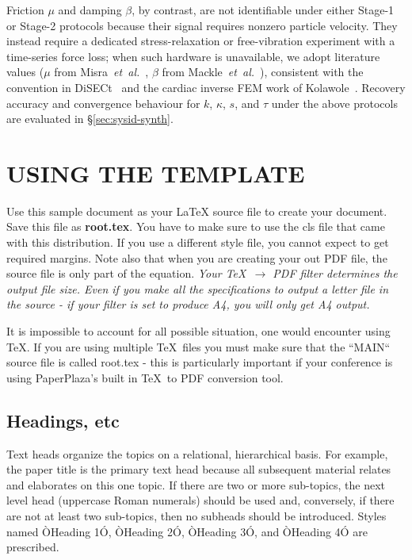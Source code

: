 \documentclass[letterpaper, 10 pt, conference]{ieeeconf}  %
\theoremstyle{tight}
\begin{document}
Friction $\mu$ and damping $\beta$, by contrast, are not identifiable
under either Stage-1 or Stage-2 protocols because their signal
requires nonzero particle velocity. They instead require a dedicated
stress-relaxation or free-vibration experiment with a time-series
force loss; when such hardware is unavailable, we adopt literature
values ($\mu$ from Misra~\textit{et~al.}~\cite{misra2010}, $\beta$
from Mackle~\textit{et~al.}~\cite{mackle2020}), consistent with the
convention in DiSECt~\cite{heiden2021disect} and the cardiac inverse
FEM work of Kolawole~\cite{kolawole2023}. Recovery accuracy and
convergence behaviour for $k$, $\kappa$, $s$, and $\tau$ under the
above protocols are evaluated in \S\ref{sec:sysid-synth}.

\section{USING THE TEMPLATE}

Use this sample document as your LaTeX source file to create your document. Save this file as {\bf root.tex}. You have to make sure to use the cls file that came with this distribution. If you use a different style file, you cannot expect to get required margins. Note also that when you are creating your out PDF file, the source file is only part of the equation. {\it Your \TeX\ $\rightarrow$ PDF filter determines the output file size. Even if you make all the specifications to output a letter file in the source - if your filter is set to produce A4, you will only get A4 output. }

It is impossible to account for all possible situation, one would encounter using \TeX. If you are using multiple \TeX\ files you must make sure that the ``MAIN`` source file is called root.tex - this is particularly important if your conference is using PaperPlaza's built in \TeX\ to PDF conversion tool.

\subsection{Headings, etc}

Text heads organize the topics on a relational, hierarchical basis. For example, the paper title is the primary text head because all subsequent material relates and elaborates on this one topic. If there are two or more sub-topics, the next level head (uppercase Roman numerals) should be used and, conversely, if there are not at least two sub-topics, then no subheads should be introduced. Styles named ÒHeading 1Ó, ÒHeading 2Ó, ÒHeading 3Ó, and ÒHeading 4Ó are prescribed.
\end{document}
